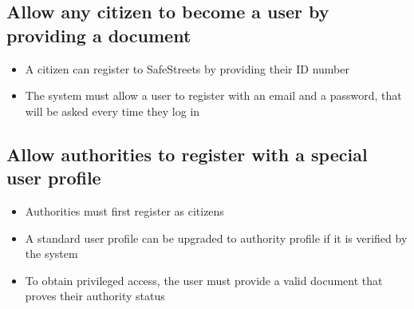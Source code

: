 \subsection{Allow any citizen to become a user by providing a document}
\begin{itemize}
    \item A citizen can register to SafeStreets by providing their ID number
    \item The system must allow a user to register with an email and a password, that will be asked every time they log in
\end{itemize}

\subsection{Allow authorities to register with a special user profile}
\begin{itemize}
    \item Authorities must first register as citizens
    \item A standard user profile can be upgraded to authority profile if it is verified by the system
    \item To obtain privileged access, the user must provide a valid document that proves their authority status
\end{itemize}